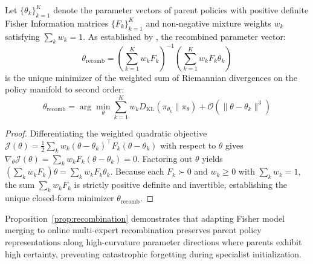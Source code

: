 \begin{prop}
\label{prop:recombination}
Let $\{\theta_k\}_{k=1}^K$ denote the parameter vectors of parent policies with positive definite Fisher Information matrices $\{F_k\}_{k=1}^K$ and non-negative mixture weights $w_k$ satisfying $\sum_k w_k = 1$. As established by \citet{matena2021merging}, the recombined parameter vector:
\begin{equation}
\theta_{\text{recomb}} = \left(\sum_{k=1}^K w_k F_k\right)^{-1} \left(\sum_{k=1}^K w_k F_k \theta_k\right)
\end{equation}
is the unique minimizer of the weighted sum of Riemannian divergences on the policy manifold to second order:
\begin{equation}
\theta_{\text{recomb}} = \arg\min_\theta \sum_{k=1}^K w_k D_{\text{KL}}(\pi_{\theta_k} \parallel \pi_\theta) + \mathcal{O}\!\left(\|\theta-\theta_k\|^3\right)
\end{equation}
\end{prop}
\begin{proof}
Differentiating the weighted quadratic objective $\mathcal{J}(\theta) = \frac{1}{2} \sum_k w_k (\theta - \theta_k)^\top F_k (\theta - \theta_k)$ with respect to $\theta$ gives $\nabla_\theta \mathcal{J}(\theta) = \sum_k w_k F_k (\theta - \theta_k) = 0$. Factoring out $\theta$ yields $\left(\sum_k w_k F_k\right) \theta = \sum_k w_k F_k \theta_k$. Because each $F_k \succ 0$ and $w_k \ge 0$ with $\sum_k w_k = 1$, the sum $\sum_k w_k F_k$ is strictly positive definite and invertible, establishing the unique closed-form minimizer $\theta_{\text{recomb}}$.
\end{proof}
\noindent Proposition~\ref{prop:recombination} demonstrates that adapting Fisher model merging to online multi-expert recombination preserves parent policy representations along high-curvature parameter directions where parents exhibit high certainty, preventing catastrophic forgetting during specialist initialization.

